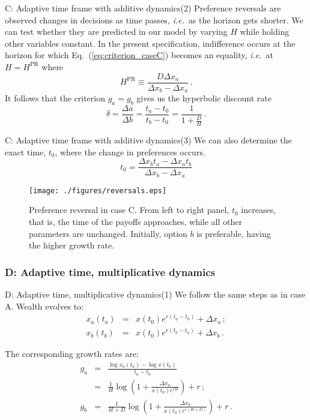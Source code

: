 \documentclass{beamer}
\newcommand{\elabel}[1]{\label{eq:#1}}
\newcommand{\eref}[1]{Eq.~(\ref{eq:#1})}
\newcommand{\ie}{{\it i.e.}\ }
\newcommand{\flabel}[1]{\label{fig:#1}}
\newcommand{\be}{\begin{equation}}
\newcommand{\ee}{\end{equation}}
\newcommand{\bea}{\begin{eqnarray}}
\newcommand{\eea}{\end{eqnarray}}
\newcommand{\Dx}{\Delta x}
\newcommand{\del}{D}
\newcommand{\hor}{H}
\numberwithin{equation}{section}
\begin{document}
\begin{frame}{C: Adaptive time frame with additive dynamics(2)}
Preference reversals are observed changes in decisions as time passes, \ie as the horizon gets shorter. We can test whether they are predicted in our model by varying $\hor$ while holding other variables constant. In the present specification, indifference occurs at the horizon for which \eref{criterion_caseC} becomes an equality, \ie at $\hor=\hor^\text{PR}$ where
\be
\hor^\text{PR} \equiv \frac{\del \Dx_a}{\Dx_b - \Dx_a}\,.
\elabel{HPR}
\ee
It follows that the criterion $g_a = g_b$ gives us the hyperbolic discount rate
\be
\delta = \frac{\Delta a}{\Delta b} = \frac{t_a-t_0}{t_b-t_0}=\frac{1}{1+\frac{D}{H}} \,.
\ee
\end{frame}

\begin{frame}{C: Adaptive time frame with additive dynamics(3)}
We can also determine the exact time, $t_0$, where the change in preferences occurs. 
\be
t_0 = \frac{\Delta x_b t_a - \Delta x_a t_b}{\Delta x_b - \Delta x_a}
\ee
\begin{figure}[!htb]
\centering
\texttt{[image: ./figures/reversals.eps]}
\caption{Preference reversal in case C. From left to right panel, $t_0$ increases, that is, the time of the payoffs approaches, while all other parameters are unchanged. Initially, option $b$ is preferable, having the higher growth rate.}
\flabel{caseA}
\end{figure}
\end{frame}

\subsubsection{D: Adaptive time, multiplicative dynamics}
\begin{frame}{D: Adaptive time, multiplicative dynamics(1)}
We follow the same steps as in case A. Wealth evolves to:
\bea
x_a\left(t_a\right) &=& x\left(t_0\right) e^{r(t_a-t_0)} + \Dx_a\,;\\
x_b\left(t_b\right) &=& x\left(t_0\right) e^{r(t_b-t_0)} + \Dx_b\,.
\eea

The corresponding growth rates are:
\bea
g_a &=& \frac{\log x_a\left(t_a\right) - \log x\left(t_0\right)}{t_a-t_0} \\&=& \frac{1}{\hor}\log{\left(1 + \frac{\Dx_a}{x\left(t_0\right)e^{r\hor}}\right)} + r \elabel{ga_D}\,;\\
g_b &=& \frac{1}{\hor + \del}\log{\left(1 + \frac{\Dx_b}{x\left(t_0\right)e^{r\left(\hor + \del\right)}}\right)} + r\,.
\elabel{gb_D}
\eea
\end{frame}
\end{document}
